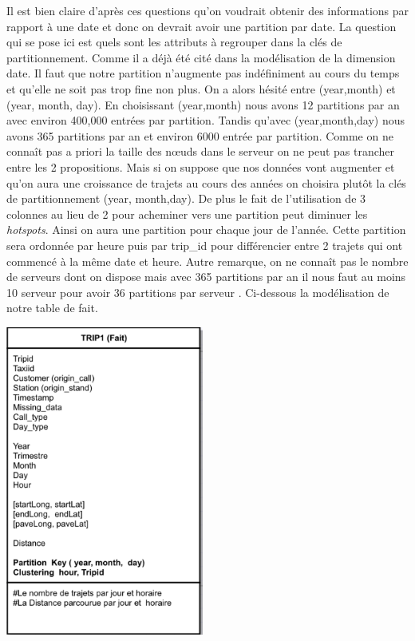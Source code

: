 \documentclass[]{report}
\begin{document}
	Il est bien claire d'après ces questions qu'on voudrait obtenir des informations par rapport à une date et donc on devrait avoir une partition par date. La question qui se pose ici est quels sont les attributs à regrouper dans la clés de partitionnement. Comme il a déjà été cité dans la modélisation de la dimension date. Il faut que notre partition n'augmente pas indéfiniment au cours du temps et qu'elle ne soit pas trop fine non plus. On a alors hésité entre (year,month) et (year, month, day).  En choisissant (year,month) nous avons 12 partitions par an avec environ 400,000 entrées par partition. Tandis qu'avec (year,month,day) nous avons 365 partitions par an et environ 6000 entrée par partition. Comme on ne connaît pas a priori la taille des nœuds dans le serveur on ne peut pas trancher entre les 2 propositions. Mais si on  suppose que nos données vont augmenter et qu'on aura une croissance de trajets au cours des années on choisira plutôt la clés de partitionnement (year, month,day).  De plus le fait de l'utilisation de 3 colonnes au lieu de 2 pour acheminer vers une partition peut diminuer les \textit{hotspots}. Ainsi on aura une partition pour chaque jour de l'année. Cette partition sera ordonnée par heure puis par trip\_id pour différencier entre 2 trajets qui ont commencé à la même date et heure. Autre remarque, on ne connaît pas le nombre de serveurs dont on dispose mais avec 365 partitions par an il nous faut au moins 10 serveur pour avoir 36 partitions par serveur . Ci-dessous la modélisation de notre table de fait. 
	\begin{center}
		\includegraphics[width=65mm]{Figures/Trip1.png}
		\label{fig:y=6}
	\end{center}
	
\end{document}
